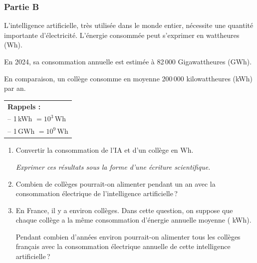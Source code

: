 \bigskip

\subsubsection*{Partie B}

L'intelligence artificielle, très utilisée dans le monde entier, nécessite une quantité importante d'électricité. L'énergie consommée peut s'exprimer en wattheures (Wh).

En 2024, sa consommation annuelle est estimée à 82\,000 Gigawattheures (GWh).

En comparaison, un collège consomme en moyenne 200\,000 kilowattheures (kWh) par an.

\medskip

\begin{center}
\begin{tabularx}{0.35\linewidth}{|X|}\hline
\textbf{Rappels :}\\
-- 1\,kWh $= 10^3$\,Wh\\
-- 1\,GWh $= 10^9$\,Wh\\ \hline
\end{tabularx}
\end{center}

\medskip

\begin{enumerate}[resume]
\item Convertir la consommation de l'IA et d'un collège en Wh.

\emph{Exprimer ces résultats sous la forme d'une écriture scientifique.}
\item Combien de collèges pourrait-on alimenter pendant un an avec la consommation électrique de l'intelligence artificielle\,?
\item En France, il y a environ  collèges. Dans cette question, on suppose que chaque collège a la même consommation d'énergie annuelle moyenne ( kWh).

Pendant combien d'années environ pourrait-on alimenter tous les collèges français avec la consommation électrique annuelle de cette intelligence artificielle\,?
\end{enumerate}


